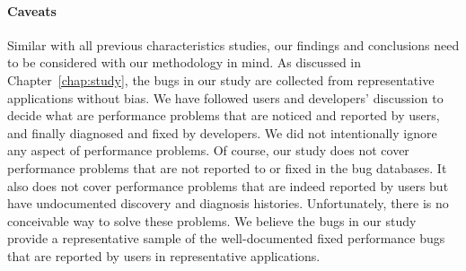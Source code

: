 \paragraph{Caveats} 
Similar with all previous characteristics studies, our findings and 
conclusions need to be considered with our methodology in mind. 
As discussed in Chapter~\ref{chap:study}, the bugs in our study are collected 
from representative applications without bias.
We have followed users and developers' discussion to decide what are 
performance problems that are noticed and reported by users, and finally
diagnosed and fixed by developers.
We did not intentionally ignore any aspect of performance problems. 
Of course, our study does not cover performance problems that are 
not reported to or fixed in the bug databases. It also does not cover
performance problems that are indeed reported by users but have undocumented
discovery and diagnosis histories.
Unfortunately, there is no conceivable way to solve these problems.
We believe the bugs in our study provide a representative sample of the 
well-documented fixed
performance bugs that are reported by users in representative applications.



